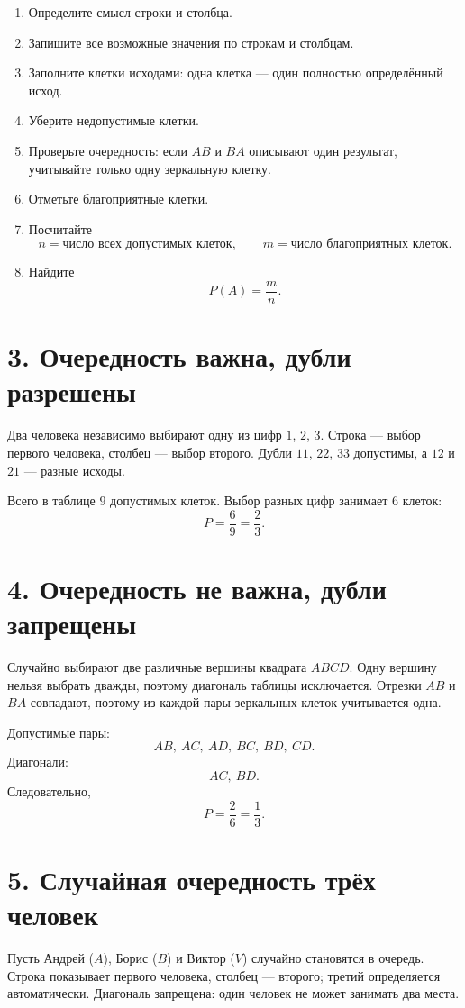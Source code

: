 \documentclass[a4paper,12pt]{article}
\begin{document}
\begin{enumerate}
\item Определите смысл строки и столбца.
\item Запишите все возможные значения по строкам и столбцам.
\item Заполните клетки исходами: одна клетка --- один полностью определённый исход.
\item Уберите недопустимые клетки.
\item Проверьте очередность: если $AB$ и $BA$ описывают один результат, учитывайте только одну зеркальную клетку.
\item Отметьте благоприятные клетки.
\item Посчитайте
\[
n=\text{число всех допустимых клеток},\qquad
m=\text{число благоприятных клеток}.
\]
\item Найдите
\[
P(A)=\frac{m}{n}.
\]
\end{enumerate}

\section*{3. Очередность важна, дубли разрешены}

Два человека независимо выбирают одну из цифр $1$, $2$, $3$.
Строка --- выбор первого человека, столбец --- выбор второго.
Дубли $11$, $22$, $33$ допустимы, а $12$ и $21$ --- разные исходы.

Всего в таблице $9$ допустимых клеток. Выбор разных цифр занимает $6$ клеток:
\[
P=\frac69=\frac23.
\]

\section*{4. Очередность не важна, дубли запрещены}

Случайно выбирают две различные вершины квадрата $ABCD$.
Одну вершину нельзя выбрать дважды, поэтому диагональ таблицы исключается.
Отрезки $AB$ и $BA$ совпадают, поэтому из каждой пары зеркальных клеток
учитывается одна.

Допустимые пары:
\[
AB,\ AC,\ AD,\ BC,\ BD,\ CD.
\]
Диагонали:
\[
AC,\ BD.
\]
Следовательно,
\[
P=\frac26=\frac13.
\]

\section*{5. Случайная очередность трёх человек}

Пусть Андрей ($A$), Борис ($B$) и Виктор ($V$) случайно становятся в очередь.
Строка показывает первого человека, столбец --- второго; третий определяется
автоматически. Диагональ запрещена: один человек не может занимать два места.
\end{document}
